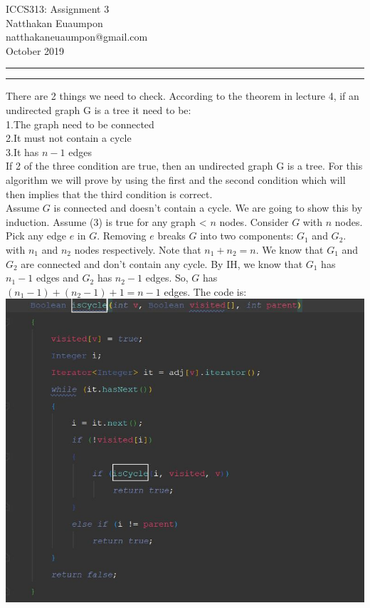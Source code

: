 \documentclass[a4paper, 11pt]{article}
\makeatletter
\newcommand{\question}[2] {\vspace{.25in} \hrule\vspace{0.5em}
\noindent{\bf #1: #2} \vspace{0.5em}
\hrule \vspace{.10in}}
\newcommand{\myname}{Natthakan Euaumpon}
\newcommand{\myemail}{natthakaneuaumpon@gmail.com}
\newcommand{\myhwnum}{3}
\makeatother
\begin{document}
\medskip                        %

\thispagestyle{plain}
\begin{center}                  %
{\Large ICCS313: Assignment \myhwnum} \\
\myname \\
\myemail \\
October 2019\\
\end{center}

\question{1}{Problem1}
There are 2 things we need to check. According to the theorem in lecture 4, if an undirected graph G is a tree it need to be:\\
1.The graph need to be connected\\
2.It must not contain a cycle\\
3.It has $n-1$ edges\\
If 2 of the three condition are true, then an undirected graph G is a tree. For this algorithm we will prove by using the first and the second condition which will then implies that the third condition is correct.\\
Assume $G$ is connected and doesn't contain a cycle. We are going to show this by induction.
Assume (3) is true for any graph < $n$ nodes. Consider $G$ with $n$ nodes. Pick any edge $e$ in $G$. Removing $e$ breaks $G$ into two components: $G_{1}$ and $G_{2}$. with $n_{1}$ and $n_{2}$ nodes respectively. Note that $n_{1} + n_{2} = n$. We know that $G_{1}$ and $G_{2}$ are connected and don’t contain any cycle. By IH, we know that $G_{1}$ has $n_{1} - 1$ edges and $G_{2}$ has $n_{2} - 1$ edges. So, $G$ has $(n_{1} - 1) + (n_{2} - 1) + 1 = n - 1$ edges.
The code is:\\
\includegraphics[width=\textwidth]{isCycle.jpg}\\
\end{document}
